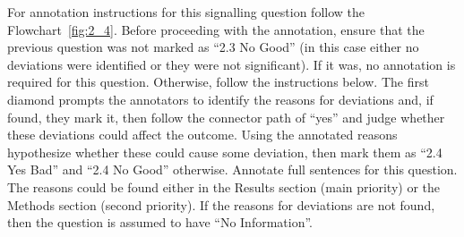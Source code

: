 \documentclass[sn-mathphys,Numbered]{sn-jnl}%
\begin{document}
For annotation instructions for this signalling question follow the Flowchart~\ref{fig:2_4}.
Before proceeding with the annotation, ensure that the previous question was not marked as ``2.3 No Good'' (in this case either no deviations were identified or they were not significant).
If it was, no annotation is required for this question.
Otherwise, follow the instructions below.
The first diamond prompts the annotators to identify the reasons for deviations and, if found, they mark it, then follow the connector path of ``yes'' and judge whether these deviations could affect the outcome.
Using the annotated reasons hypothesize whether these could cause some deviation, then mark them as ``2.4 Yes Bad'' and ``2.4 No Good'' otherwise.
Annotate full sentences for this question.
The reasons could be found either in the Results section (main priority) or the Methods section (second priority).
If the reasons for deviations are not found, then the question is assumed to have ``No Information''.
%
%
%
\end{document}

